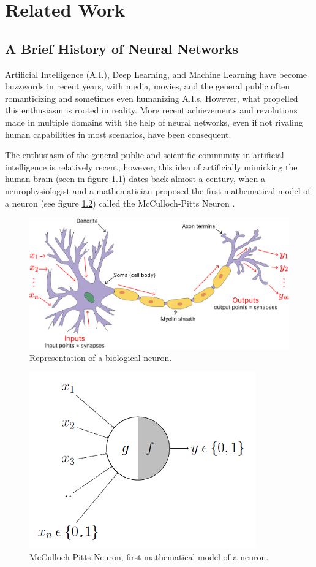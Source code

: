 \chapter{Related Work}
\label{RelatedWork}
\section{A Brief History of Neural Networks}
\label{history_of_neural_networks}

\overridetextsize
Artificial Intelligence (A.I.), Deep Learning, and Machine Learning have become
buzzwords in recent years, with media, movies, and the general public often
romanticizing and sometimes even humanizing A.I.s. However, what propelled this
enthusiasm is rooted in reality. More recent achievements and revolutions made
in multiple domains with the help of neural networks, even if not rivaling human
capabilities in most scenarios, have been consequent.

The enthusiasm of the general public and scientific community in artificial
intelligence is relatively recent; however, this idea of artificially mimicking
the human brain (seen in figure \ref{fig:biological_neuron}) dates back almost a
century, when a neurophysiologist and a mathematician proposed the first
mathematical model of a neuron (see figure \ref{fig:mccullock_neuron}) called
the McCulloch-Pitts Neuron \cite{warren_s_mcculloch_walter_pitts_logical_1943}.

\begin{figure}[ht]
    \includegraphics[clip,width=1\columnwidth]{Figures/related/biological_neuron.png}
    \caption{ Representation of a biological neuron. }
    \label{fig:biological_neuron}
\end{figure}

\begin{figure}[htp]
    \centering
    \includegraphics[clip,width=.5\columnwidth]{Figures/related/cullock-neuron.png}
    \caption{ McCulloch-Pitts Neuron, first mathematical model of a neuron. }
    \label{fig:mccullock_neuron}
\end{figure}

